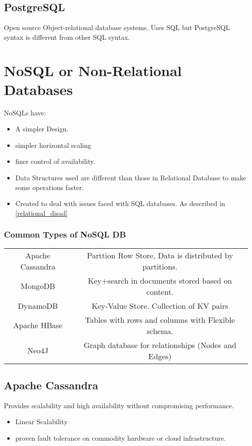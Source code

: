 \documentclass[
	paper=a4,%
	pagesize,%
	8pt, fleqn,%
	headings=small,%
	notitlepage,%
	parskip=never]%
	{scrreprt}
\begin{document}
\begin{multicols*}{3}
\subsection{PostgreSQL}
Open source Object-relational database systems. Uses SQL but PostgreSQL syntax is different from other SQL syntax. 

\section{NoSQL or Non-Relational Databases}
NoSQLs have:
\begin{itemize}
\item A simpler Design.
\item simpler horizontal scaling 
\item finer control of availability.
\item Data Structures used are different than those in Relational Database to make some operations faster. 
\item Created to deal with issues faced with SQL databases. As described in \ref{relational_disad}
\end{itemize}

\subsubsection{Common Types of NoSQL DB}

\begin{tabular}{ |c|c| } 
 \hline
 Apache Cassandra & Parttion Row Store, Data is distributed by partitions. \\ 
 MongoDB & Key+search in documents stored based on content.  \\ 
 DynamoDB & Key-Value Store. Collection of KV pairs \\ 
 Apache HBase & Tables with rows and columns with Flexible schema. \\
 Neo4J & Graph database for relationships (Nodes and Edges) \\
 \hline
\end{tabular}

\subsection{Apache Cassandra}
Provides scalability and high availability without compromising performance. 
\begin{itemize}
\item Linear Scalability 
\item proven fault tolerance on commodity hardware or cloud infrastructure. 


\end{itemize}
\end{multicols*}
\end{document}
